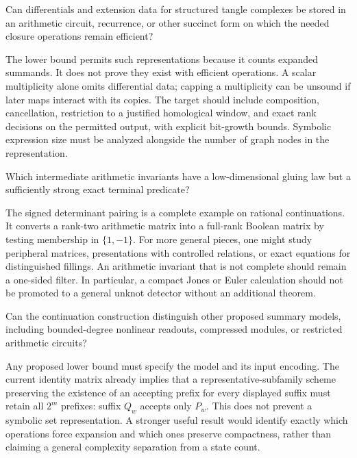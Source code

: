 \begin{researchquestion}
Can differentials and extension data for structured tangle complexes be
stored in an arithmetic circuit, recurrence, or other succinct form on
which the needed closure operations remain efficient?
\end{researchquestion}
The lower bound permits such representations because it counts expanded
summands. It does not prove they exist with efficient operations.
A scalar multiplicity alone omits differential data; capping a multiplicity
can be unsound if later maps interact with its copies. The target should
include composition, cancellation, restriction to a justified homological
window, and exact rank decisions on the permitted output, with explicit
bit-growth bounds. Symbolic expression size must be analyzed alongside
the number of graph nodes in the representation.

\begin{researchquestion}
Which intermediate arithmetic invariants have a low-dimensional gluing
law but a sufficiently strong exact terminal predicate?
\end{researchquestion}
The signed determinant pairing is a complete example on rational
continuations. It converts a rank-two arithmetic matrix into a full-rank
Boolean matrix by testing membership in \(\{1,-1\}\).
For more general pieces, one might study peripheral matrices, presentations
with controlled relations, or exact equations for distinguished fillings.
An arithmetic invariant that is not complete should remain a one-sided
filter. In particular, a compact Jones or Euler calculation should not be
promoted to a general unknot detector without an additional theorem.

\begin{researchquestion}
Can the continuation construction distinguish other proposed summary
models, including bounded-degree nonlinear readouts, compressed modules,
or restricted arithmetic circuits?
\end{researchquestion}
Any proposed lower bound must specify the model and its input encoding.
The current identity matrix already implies that a representative-subfamily
scheme preserving the existence of an accepting prefix for every displayed
suffix must retain all \(2^m\) prefixes: suffix \(Q_w\) accepts only \(P_w\).
This does not prevent a symbolic set representation. A stronger useful
result would identify exactly which operations force expansion and which
ones preserve compactness, rather than claiming a general complexity
separation from a state count.

